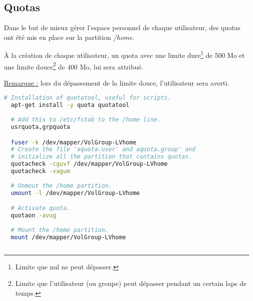 \subsection{Quotas}
\label{subsec:quotas}

Dans le but de mieux gérer l'espace personnel de chaque utilisateur, des quotas
ont été mis en place sur la partition \textit{/home}.

À la création de chaque utilisateur, un quota avec une limite
dure\footnote{Limite que nul ne peut dépasser.} de 500 Mo et une limite
douce\footnote{Limite que l'utilisateur (ou groupe) peut dépasser pendant un
certain laps de temps.} de 400 Mo, lui sera attribué.

\underline{Remarque :} lors du dépassement de la limite douce, l'utilisateur
sera averti.

\begin{lstlisting}[language=bash]
  # Installation of quotatool, useful for scripts.
  apt-get install -y quota quotatool
  
  # Add this to /etc/fstab to the /home line.
  usrquota,grpquota

  fuser -k /dev/mapper/VolGroup-LVhome
  # Create the file 'aquota.user' and aquota.group' and
  # initialize all the partition that contains quotas.
  quotacheck -cguvf /dev/mapper/VolGroup-LVhome
  quotacheck -vagum
  
  # Unmout the /home partition.
  umount -l /dev/mapper/VolGroup-LVhome

  # Activate quota.
  quotaon -avug
  
  # Mount the /home partition.
  mount /dev/mapper/VolGroup-LVhome
  
\end{lstlisting}

